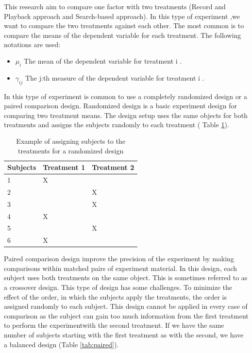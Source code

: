 This research aim to compare one factor with two treatments (Record and Playback approach and Search-based approach). In this type of experiment ,we want to compare the two treatments against each other. The most common is to compare the means of the dependent variable for each treatment. The following notations are used:

\begin{itemize}
\item  $\mu_{i}$ The mean of the dependent variable for treatment i .
\item $\gamma_{ij}$ The j:th measure of the dependent variable for treatment i .
\end{itemize}

In this type of experiment is common to use a completely randomized design or a paired comparison design. Randomized design is a basic experiment design for comparing two treatment means. The design setup uses the same objects for both treatments and assigns the subjects randomly to each treatment ( Table \ref{tab:random}).

\begin{table}[]
\centering
\caption{Example of assigning subjects to the treatments for a randomized design}
\label{tab:random}
\begin{tabular}{|l|l|l|}
\hline
\rowcolor[HTML]{C0C0C0} 
\textbf{Subjects} & \textbf{Treatment 1} & \textbf{Treatment 2} \\ \hline
1                 & X                    &                      \\ \hline
2                 &                      & X                    \\ \hline
3                 &                      & X                    \\ \hline
4                 & X                    &                      \\ \hline
5                 &                      & X                    \\ \hline
6                 & X                    &                      \\ \hline
\end{tabular}
\end{table}

Paired comparison design improve the precision of the experiment by making comparisons within matched pairs of experiment material. In this design, each subject uses both treatments on the same object. This is sometimes referred to as a crossover design. This type of design has some challenges. To minimize the effect of the order, in which the subjects apply the treatments, the order is assigned randomly to each subject. This design cannot be applied in every case of comparison as the subject can gain too much information from the first treatment to perform the experimentwith the second treatment. If we have the same number of subjects starting with the first treatment as with the second, we have a balanced design (Table \ref{tab:paired}).

